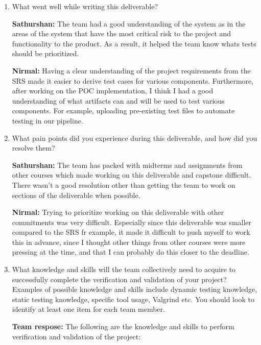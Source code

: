 \documentclass[12pt, titlepage]{article}
\begin{document}
\begin{enumerate}
  \item What went well while writing this deliverable?

  \textbf{Sathurshan:} The team had a good understanding of the system as in
  the areas of the system that have the most critical risk to the project and
  functionality to the product. As a result, it helped the team know whats tests
  should be prioritized.

  \textbf{Nirmal:} Having a clear understanding of the project requirements 
  from the SRS made it easier to derive test cases for various components. 
  Furthermore, after working on the POC implementation, I think I had a good 
  understanding of what artifacts can and will be used to test various 
  components. For example, uploading pre-existing test files to automate 
  testing in our pipeline.

  \item What pain points did you experience during this deliverable, and how
    did you resolve them?

  \textbf{Sathurshan:} The team has packed with midterms and assignments from
  other courses which made working on this deliverable and capstone difficult.
  There wasn't a good resolution other than getting the team to work on sections
  of the deliverable when possible.

  \textbf{Nirmal:} Trying to prioritize working on this deliverable with other 
  commitments was very difficult. Especially since this deliverable was smaller 
  compared to the SRS fr example, it made it difficult to push myself to work 
  this in advance, since I thought other things from other courses were more 
  pressing at the time, and that I can probably do this closer to the deadline.

  \item What knowledge and skills will the team collectively need to acquire to
  successfully complete the verification and validation of your project?
  Examples of possible knowledge and skills include dynamic testing knowledge,
  static testing knowledge, specific tool usage, Valgrind etc.  You should look
  to identify at least one item for each team member.
  
  \textbf{Team respose:} The following are the knowledge and skills to perform
  verification and validation of the project:


\end{enumerate}
\end{document}
